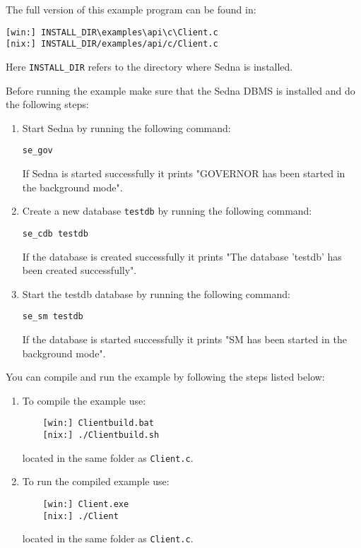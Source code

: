 \documentclass[a4paper,12pt]{article}
\begin{document}
The full version of this example program can be found in:
\begin{verbatim}
[win:] INSTALL_DIR\examples\api\c\Client.c
[nix:] INSTALL_DIR/examples/api/c/Client.c
\end{verbatim}

Here \verb!INSTALL_DIR! refers to the directory where Sedna is installed.

Before running the example make sure that the Sedna DBMS is installed and do the
following steps:

\begin{enumerate}
\item Start Sedna by running the following command:
\begin{verbatim}
se_gov
\end{verbatim}
If Sedna is started successfully it prints "GOVERNOR has been started in
the background mode".
\item Create a new database \verb!testdb! by running the following command:
\begin{verbatim}
se_cdb testdb
\end{verbatim}
If the database is created successfully it prints "The database 'testdb' has
been created successfully".
\item Start the testdb database by running the following command:
\begin{verbatim}
se_sm testdb
\end{verbatim}
If the database is started successfully it prints "SM has been started in
the background mode".
\end{enumerate}

You can compile and run the example by following the steps listed below:

\begin{enumerate}
\item To compile the example use:
\begin{verbatim}
    [win:] Clientbuild.bat
    [nix:] ./Clientbuild.sh
\end{verbatim}
located in the same folder as \verb!Client.c!.

\item To run the compiled example use:
\begin{verbatim}
    [win:] Client.exe
    [nix:] ./Client
\end{verbatim}
located in the same folder as \verb!Client.c!.
\end{enumerate}


\end{document}
